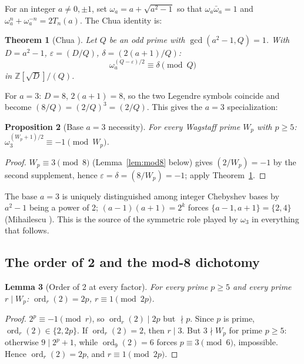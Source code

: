 \documentclass[11pt]{amsart}
\theoremstyle{plain}
\newtheorem{theorem}{Theorem}[section]
\newtheorem{proposition}[theorem]{Proposition}
\newtheorem{lemma}[theorem]{Lemma}
\theoremstyle{definition}
\theoremstyle{remark}
\numberwithin{equation}{section}
\newcommand{\ord}{\operatorname{ord}}
\newcommand{\Z}{\mathbb{Z}}
\begin{document}
For an integer $a \neq 0, \pm 1$, set $\omega_a = a + \sqrt{a^2 - 1}$ so that $\omega_a \bar\omega_a = 1$ and $\omega_a^n + \omega_a^{-n} = 2 T_n(a)$. The Chua identity is:

\begin{theorem}[Chua \cite{ref:Chua}]\label{thm:chua}
Let $Q$ be an odd prime with $\gcd(a^2 - 1, Q) = 1$. With $D = a^2 - 1$, $\varepsilon = (D/Q)$, $\delta = (2(a+1)/Q)$:
\[
  \omega_a^{(Q - \varepsilon)/2} \equiv \delta \pmod Q
\]
in $\Z[\sqrt{D}]/(Q)$.
\end{theorem}

For $a = 3$: $D = 8$, $2(a+1) = 8$, so the two Legendre symbols coincide and become $(8/Q) = (2/Q)^3 = (2/Q)$. This gives the $a = 3$ specialization:

\begin{proposition}[Base $a = 3$ necessity]\label{prop:necessity}
For every Wagstaff prime $W_p$ with $p \geq 5$: $\omega_3^{(W_p + 1)/2} \equiv -1 \pmod{W_p}$.
\end{proposition}

\begin{proof}
$W_p \equiv 3 \pmod 8$ (Lemma~\ref{lem:mod8} below) gives $(2/W_p) = -1$ by the second supplement, hence $\varepsilon = \delta = (8/W_p) = -1$; apply Theorem~\ref{thm:chua}.
\end{proof}

The base $a = 3$ is uniquely distinguished among integer Chebyshev bases by $a^2 - 1$ being a power of 2; $(a-1)(a+1) = 2^k$ forces $\{a - 1, a + 1\} = \{2, 4\}$ (Mihailescu \cite{ref:Mihailescu}). This is the source of the symmetric role played by $\omega_3$ in everything that follows.

\subsection{The order of 2 and the mod-8 dichotomy}

\begin{lemma}[Order of 2 at every factor]\label{lem:ord2}
For every prime $p \geq 5$ and every prime $r \mid W_p$: $\ord_r(2) = 2p$, $r \equiv 1 \pmod{2p}$.
\end{lemma}

\begin{proof}
$2^p \equiv -1 \pmod r$, so $\ord_r(2) \mid 2p$ but $\nmid p$. Since $p$ is prime, $\ord_r(2) \in \{2, 2p\}$. If $\ord_r(2)=2$, then $r\mid 3$. But $3\nmid W_p$ for prime $p\geq5$: otherwise $9\mid 2^p+1$, while $\ord_9(2)=6$ forces $p\equiv3\pmod6$, impossible. Hence $\ord_r(2)=2p$, and $r\equiv1\pmod{2p}$.
\end{proof}
\end{document}
